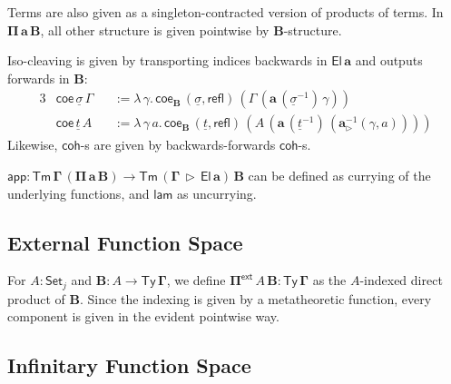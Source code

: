 \documentclass{article}
\theoremstyle{definition}
\theoremstyle{theorem}
\newcommand{\refl}{\mathsf{refl}}
\newcommand{\Tm}{\mathsf{Tm}}
\newcommand{\Ty}{\mathsf{Ty}}
\newcommand{\El}{\mathsf{El}}
\newcommand{\ra}{\rightarrow}
\newcommand{\Set}{\mathsf{Set}}
\newcommand{\ext}{\triangleright}
\newcommand{\Pii}{\Pi}
\newcommand{\appi}{\mathsf{app}}
\newcommand{\lami}{\mathsf{lam}}
\newcommand{\Pie}{\Pi^{\mathsf{ext}}}
\newcommand{\bTy}{\boldsymbol{\Ty}}
\newcommand{\bGamma}{\boldsymbol{\Gamma}}
\newcommand{\ba}{\boldsymbol{a}}
\newcommand{\bB}{\boldsymbol{B}}
\newcommand{\bEl}{\boldsymbol{\El}}
\newcommand{\bPii}{\boldsymbol{\Pi}}
\newcommand{\bPie}{\boldsymbol{\Pie}}
\newcommand{\ul}[1]{\underline{#1}}
\newcommand{\ulsigma}{\ul{\sigma}}
\newcommand{\ult}{\ul{t}}
\newcommand{\coe}{\mathsf{coe}}
\newcommand{\coh}{\mathsf{coh}}
\begin{document}
Terms are also given as a singleton-contracted version of products of terms. In
$\bPii\,\ba\,\bB$, all other structure is given pointwise by $\bB$-structure.

Iso-cleaving is given by transporting indices backwards in $\bEl\,\ba$ and outputs forwards
in $\bB$:
\begin{alignat*}{3}
  & \coe\,\ulsigma\,\Gamma &&:=
    \lambda\,\gamma.\,\coe_{\bB}\,(\ulsigma,\refl)\,(\Gamma\,(\ba\,(\ulsigma^{-1})\,\gamma))\\
  & \coe\,\ult\,A &&:=
    \lambda\,\gamma\,a.\,\coe_{\bB}\,(\ult,\refl)\,(A\,(\ba\,(\ult^{-1})\,(\ba_{\ext}^{-1}(\gamma,a))))
\end{alignat*}
Likewise, $\coh$-s are given by backwards-forwards $\coh$-s.

$\boldsymbol{\appi : \Tm\,\Gamma\,(\Pii\,a\,B)\ra
  \Tm\,(\Gamma\,\ext\,\El\,a)\,B}$ can be defined as currying of the underlying
functions, and $\boldsymbol{\lami}$ as uncurrying.


\subsection{External Function Space}

For $A : \Set_j$ and $\bB : A \ra \bTy\,\bGamma$, we define $\bPie\,A\,\bB
\boldsymbol{:} \bTy\,\bGamma$ as the $A$-indexed direct product of $\bB$. Since
the indexing is given by a metatheoretic function, every component is given in the
evident pointwise way.

\subsection{Infinitary Function Space}
\label{sec:infinitaryfunction}
\end{document}
